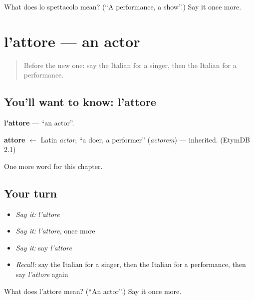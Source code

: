\begin{tcolorbox}[breakable,colback=teal!4,colframe=teal!35!black,title={Before you move on}]
What does lo spettacolo mean? (\textquotedblleft{}A performance, a show\textquotedblright{}.) Say it once more.
\end{tcolorbox}
\section[l'attore]{l'attore — an actor}

\label{lesson:IT-C194-attore}



\begin{quote}
Before the new one: say the Italian for a singer, then the Italian for a performance.
\end{quote}

\subsection*{You'll want to know: l'attore}
\textbf{l'attore} — \textquotedblleft{}an actor\textquotedblright{}.

\begin{cousinweb}
\textbf{attore} $\leftarrow$ Latin \emph{actor}, \textquotedblleft{}a doer, a performer\textquotedblright{} (\emph{actorem}) — inherited. (EtymDB 2.1)
\end{cousinweb}

\begin{grammarlens}[title={What you've built}]
One more word for this chapter.
\end{grammarlens}

\subsection*{Your turn}
\begin{itemize}
\raggedright
  \item \emph{Say it:} \emph{l'attore}
  \item \emph{Say it:} \emph{l'attore}, once more
  \item \emph{Say it:} say \emph{l'attore}
  \item \emph{Recall:} say the Italian for a singer, then the Italian for a performance, then say \emph{l'attore} again
\end{itemize}

\begin{tcolorbox}[breakable,colback=teal!4,colframe=teal!35!black,title={Before you move on}]
What does l'attore mean? (\textquotedblleft{}An actor\textquotedblright{}.) Say it once more.
\end{tcolorbox}
